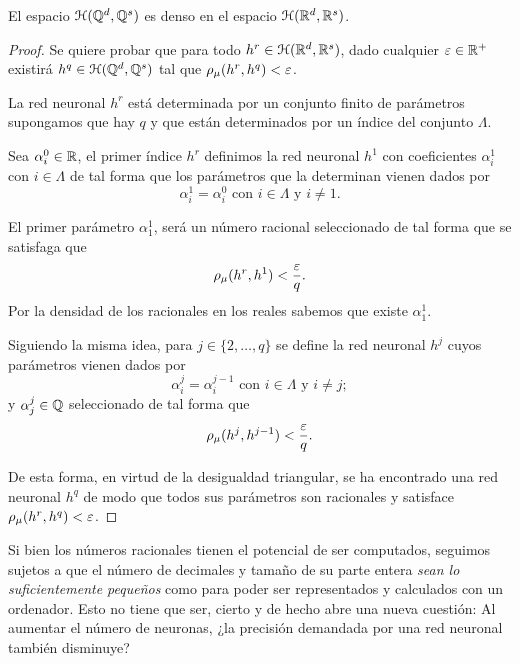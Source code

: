 \begin{aportacionOriginal}
    \begin{teorema}
        El espacio $\mathcal{H}(\mathbb{Q}^d, \mathbb{Q}^s)$ es denso en el espacio $\mathcal{H}(\mathbb{R}^d,\mathbb{R}^s)$. 
    \end{teorema}
    \begin{proof}
        Se quiere probar que para todo $h^r \in \mathcal{H}(\mathbb{R}^d,\mathbb{R}^s)$,
         dado cualquier $\varepsilon \in \mathbb{R}^+$  
        existirá $h^q \in \mathcal{H}(\mathbb{Q}^d, \mathbb{Q}^s)$ tal que 
        $\rho_{\mu}( h^r, h^q) < \varepsilon$. 

        La red neuronal $h^r$ está determinada por un conjunto finito
        de parámetros supongamos que hay $q$ y que están determinados por un índice del conjunto $\Lambda$. 

        Sea $\alpha^0_i \in \mathbb{R}$, el primer índice $h^r$ definimos la red neuronal $h^1$ con coeficientes  $\alpha^1_i$ con $i\in \Lambda$
        de tal forma que los parámetros que la determinan vienen dados por
        \begin{equation*}
            \alpha^1_i = \alpha^0_i 
            \text{ con } i \in \Lambda
            \text{ y } i \neq 1.
        \end{equation*}

        El primer parámetro $\alpha^1_1$, será un número racional 
        seleccionado de tal forma que se satisfaga que 
        \begin{equation*}
            \rho_{\mu}( h^r, h^1) < \frac{\varepsilon}{q}.
        \end{equation*}
        Por la densidad de los racionales en los reales sabemos que  existe $\alpha^1_1$.

        Siguiendo la misma idea, para $j \in \{2,\ldots, q\}$ se define la red neuronal 
        $h^j$ cuyos parámetros vienen dados por 
        \begin{equation*}
            \alpha^j_i = \alpha^{j-1}_i 
            \text{ con } i \in \Lambda
            \text{ y } i \neq j;
        \end{equation*}
        y $\alpha^j_j \in \mathbb{Q}$ seleccionado de tal forma que  
        \begin{equation*}
            \rho_{\mu}( h^j, h^{j-1}) < \frac{\varepsilon}{q}.
        \end{equation*}

        De esta forma, en virtud de la desigualdad triangular,  se ha 
        encontrado una red neuronal $h^q$
        de modo que todos sus parámetros son racionales y 
        satisface 
        $\rho_{\mu}( h^r, h^q) < \varepsilon$.
    \end{proof}

    Si bien los números racionales tienen el potencial de ser computados, seguimos sujetos a que el número de decimales y tamaño de su parte entera \textit{sean lo suficientemente pequeños} como para poder ser representados 
    y calculados con un ordenador. Esto no tiene que ser, cierto y de hecho abre una nueva cuestión:
     Al aumentar el número de neuronas, ¿la precisión demandada por una red neuronal también disminuye?  
\end{aportacionOriginal} 

